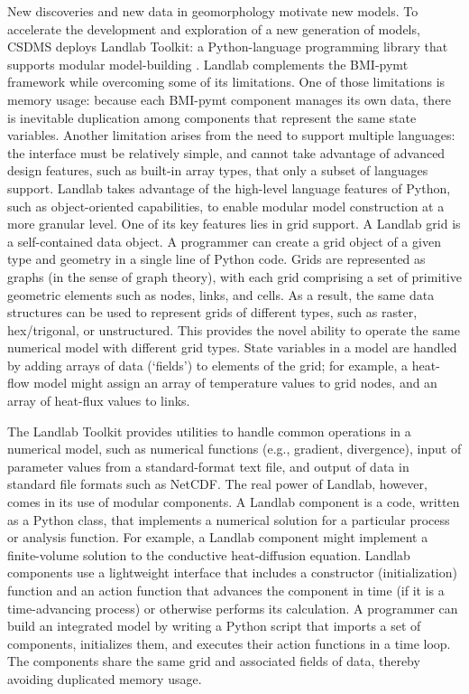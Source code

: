 \documentclass[10pt,twocolumn,preprint]{elsarticle}
\begin{document}
New discoveries and new data in geomorphology motivate new models. To accelerate the development and exploration of a new generation of models, CSDMS deploys Landlab Toolkit: a Python-language programming library that supports modular model-building \citep{hobley2017creative,barnhart2020short}. Landlab complements the BMI-pymt framework while overcoming some of its limitations. One of those limitations is memory usage: because each BMI-pymt component manages its own data, there is inevitable duplication among components that represent the same state variables. Another limitation arises from the need to support multiple languages: the interface must be relatively simple, and cannot take advantage of advanced design features, such as built-in array types, that only a subset of languages support. Landlab takes advantage of the high-level language features of Python, such as object-oriented capabilities, to enable modular model construction at a more granular level. One of its key features lies in grid support. A Landlab grid is a self-contained data object. A programmer can create a grid object of a given type and geometry in a single line of Python code. Grids are represented as graphs (in the sense of graph theory), with each grid comprising a set of primitive geometric elements such as nodes, links, and cells. As a result, the same data structures can be used to represent grids of different types, such as raster, hex/trigonal, or unstructured. This provides the novel ability to operate the same numerical model with different grid types. State variables in a model are handled by adding arrays of data (`fields') to elements of the grid; for example, a heat-flow model might assign an array of temperature values to grid nodes, and an array of heat-flux values to links. 

The Landlab Toolkit provides utilities to handle common operations in a numerical model, such as numerical functions (e.g., gradient, divergence), input of parameter values from a standard-format text file, and output of data in standard file formats such as NetCDF. The real power of Landlab, however, comes in its use of modular components. A Landlab component is a code, written as a Python class, that implements a numerical solution for a particular process or analysis function. For example, a Landlab component might implement a finite-volume solution to the conductive heat-diffusion equation. Landlab components use a lightweight interface that includes a constructor (initialization) function and an action function that advances the component in time (if it is a time-advancing process) or otherwise performs its calculation. A programmer can build an integrated model by writing a Python script that imports a set of components, initializes them, and executes their action functions in a time loop. The components share the same grid and associated fields of data, thereby avoiding duplicated memory usage.
\end{document}
